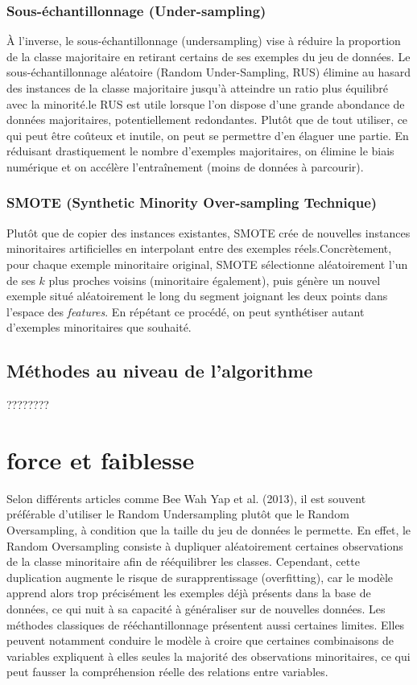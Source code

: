 \documentclass[a4paper,12pt]{article}
\begin{document}
\subsubsection{Sous-échantillonnage (Under-sampling)}

À l’inverse, le sous-échantillonnage (undersampling) vise à réduire la proportion de la classe
majoritaire en retirant certains de ses exemples du jeu de données. Le sous-échantillonnage aléatoire
(Random Under-Sampling, RUS) élimine au hasard des instances de la classe majoritaire jusqu’à atteindre
un ratio plus équilibré avec la minorité.le RUS est utile lorsque l’on dispose d’une grande abondance de
données majoritaires, potentiellement redondantes. Plutôt que de tout utiliser, ce qui peut être
coûteux et inutile, on peut se permettre d’en élaguer une partie. En réduisant drastiquement le nombre
d’exemples majoritaires, on élimine le biais numérique et on accélère l’entraînement (moins de
données à parcourir).

\subsubsection{SMOTE (Synthetic Minority Over-sampling Technique)}



Plutôt que de copier des instances existantes,
SMOTE crée de nouvelles instances minoritaires artificielles en interpolant entre des exemples réels.Concrètement, pour chaque exemple minoritaire original, SMOTE sélectionne aléatoirement l’un de ses
$k$ plus proches voisins (minoritaire également), puis génère un nouvel exemple situé aléatoirement le
long du segment joignant les deux points dans l’espace des \textit{features}. En répétant ce procédé, on
peut synthétiser autant d’exemples minoritaires que souhaité.



\subsection{Méthodes au niveau de l'algorithme }
????????
\newpage
\section{force et faiblesse }
Selon différents articles comme Bee Wah Yap et al. (2013), il est souvent préférable d’utiliser le Random Undersampling plutôt que le Random Oversampling, à condition que la taille du jeu de données le permette.
 En effet, le Random Oversampling consiste à dupliquer aléatoirement certaines observations de la classe minoritaire afin de rééquilibrer les classes. Cependant, cette duplication augmente le risque de surapprentissage (overfitting),
  car le modèle apprend alors trop précisément les exemples déjà présents dans la base de données, ce qui nuit à sa capacité à généraliser sur de nouvelles données.
Les méthodes classiques de rééchantillonnage présentent aussi certaines limites. Elles peuvent notamment conduire le modèle à croire que certaines combinaisons de variables expliquent à elles seules la majorité des observations minoritaires, ce qui peut fausser
 la compréhension réelle des relations entre variables.\medskip
\end{document}
